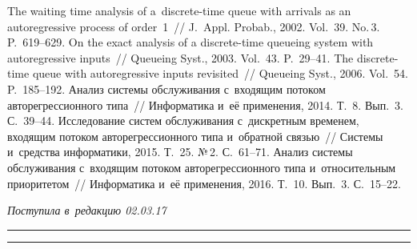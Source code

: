 \begin{multicols}{2}
{\small\frenchspacing
 {%
 \begin{thebibliography}{9}
 The waiting time analysis of 
a~discrete-time queue with arrivals as an autoregressive process of order~1~// 
J.~Appl. Probab., 2002. Vol.~39. No.\,3. P.~619--629.
 On the exact analysis of a discrete-time queueing
system with autoregressive inputs~// Queueing Syst., 2003. Vol.~43.  P.~29--41.
 The discrete-time queue with autoregressive inputs revisited~// 
Queueing Syst., 2006. Vol.~54. P.~185--192.
 Анализ системы обслуживания с~входящим
потоком авторегрессионного типа~// Информатика и~её применения, 2014.
Т.~8. Вып.~3. С.~39--44.
 Исследование систем обслуживания с~дискретным временем, входящим потоком авторегрессионного типа и~обратной
связью~// Системы и~средства информатики, 2015. Т.~25. №\,2. С.~61--71.
 Анализ системы обслуживания с~входящим потоком 
авторегрессионного типа и~относительным приоритетом~// Информатика и~её применения, 
2016. Т.~10. Вып.~3. С.~15--22.
 \end{thebibliography}

 }
 }

\end{multicols}

\vspace*{-3pt}

\hfill{\small\textit{Поступила в~редакцию 02.03.17}}

\vspace*{8pt}



\hrule

\vspace*{2pt}

\hrule



\def\tit{SINGLE SERVER QUEUEING SYSTEM WITH~DEPENDENT INTERARRIVAL TIMES}

\def\titkol{Single server queueing system with~dependent interarrival times}

\def\aut{V.\,G.~Ushakov$^{1,2}$ and~N.\,G.~Ushakov$^{3,4}$}

